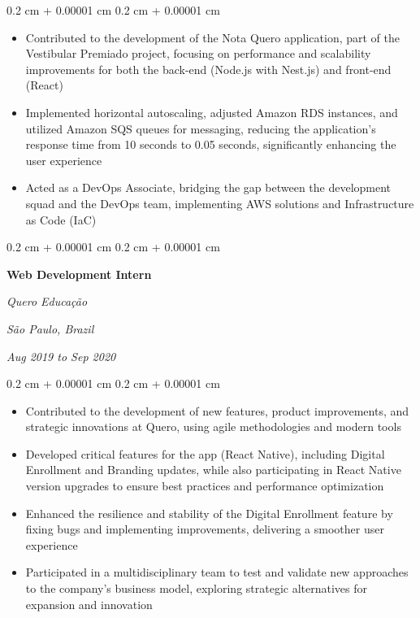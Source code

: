 \documentclass[10pt, a4paper]{article}
\newenvironment{highlights}{
    \begin{itemize}[
        topsep=0.10 cm,
        parsep=0.10 cm,
        partopsep=0pt,
        itemsep=0pt,
        leftmargin=0.4 cm + 10pt
    ]
}{
    \end{itemize}
} %
\newenvironment{onecolentry}{
    \begin{adjustwidth}{
        0.2 cm + 0.00001 cm
    }{
        0.2 cm + 0.00001 cm
    }
}{
    \end{adjustwidth}
} %
\newenvironment{twocolentry}[2][]{
    \onecolentry
    \def\secondColumn{#2}
    \setcolumnwidth{\fill, 7 cm}
    \begin{paracol}{2}
}{
    \switchcolumn \raggedleft \secondColumn
    \end{paracol}
    \endonecolentry
} %
\begin{document}
        \vspace{0.10 cm}
        \begin{onecolentry}
            \begin{highlights}
                \item Contributed to the development of the Nota Quero application, part of the Vestibular Premiado project, focusing on performance and scalability improvements for both the back-end (Node.js with Nest.js) and front-end (React)
                \item Implemented horizontal autoscaling, adjusted Amazon RDS instances, and utilized Amazon SQS queues for messaging, reducing the application's response time from 10 seconds to 0.05 seconds, significantly enhancing the user experience
                \item Acted as a DevOps Associate, bridging the gap between the development squad and the DevOps team, implementing AWS solutions and Infrastructure as Code (IaC)
            \end{highlights}
        \end{onecolentry}


        \vspace{0.2 cm}

        \begin{twocolentry}{
        \textit{São Paulo, Brazil}    
            
        \textit{Aug 2019 to Sep 2020}}
            \textbf{Web Development Intern}
            
            \textit{Quero Educação}
        \end{twocolentry}

        \vspace{0.10 cm}
        \begin{onecolentry}
            \begin{highlights}
                \item Contributed to the development of new features, product improvements, and strategic innovations at Quero, using agile methodologies and modern tools
                \item Developed critical features for the app (React Native), including Digital Enrollment and Branding updates, while also participating in React Native version upgrades to ensure best practices and performance optimization
                \item Enhanced the resilience and stability of the Digital Enrollment feature by fixing bugs and implementing improvements, delivering a smoother user experience
                \item Participated in a multidisciplinary team to test and validate new approaches to the company’s business model, exploring strategic alternatives for expansion and innovation
            \end{highlights}
        \end{onecolentry}
\end{document}
